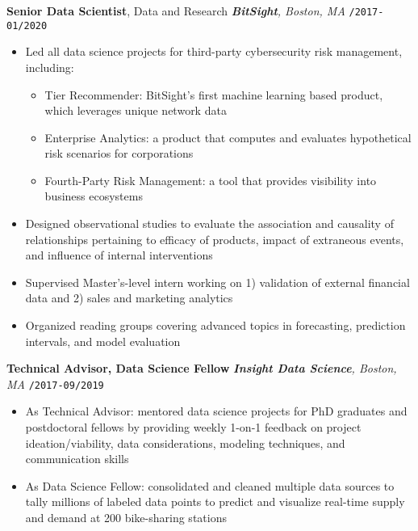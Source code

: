 \documentclass[10pt,english]{report}
\begin{document}
\vspace{1mm}

\textbf{Senior Data Scientist}, Data and Research \hfill \textit{\textbf{BitSight}, Boston, MA} \texttt{/2017-01/2020}
\begin{itemize}
		\item Led all data science projects for third-party cybersecurity risk management, including:
		\begin{itemize}
				\item Tier Recommender: BitSight's first machine learning based product, which leverages unique network data
				\item Enterprise Analytics: a product that computes and evaluates hypothetical risk scenarios for corporations
				\item Fourth-Party Risk Management: a tool that provides visibility into business ecosystems
		\end{itemize}
    \item Designed observational studies to evaluate the association and causality of relationships pertaining to efficacy of products, impact of extraneous events, and influence of internal interventions
		\item Supervised Master's-level intern working on 1) validation of external financial data and 2) sales and marketing analytics
		\item Organized reading groups covering advanced topics in forecasting, prediction intervals, and model evaluation
\end{itemize}

\vspace{1mm}

\textbf{Technical Advisor, Data Science Fellow} \hfill \textit{\textbf{Insight Data Science}, Boston, MA} \texttt{/2017-09/2019}
\begin{itemize}
    \item As Technical Advisor: mentored data science projects for PhD graduates and postdoctoral fellows by providing weekly 1-on-1 feedback on project ideation/viability, data considerations, modeling techniques, and communication skills
    \item As Data Science Fellow: consolidated and cleaned multiple data sources to tally millions of labeled data points to predict and visualize real-time supply and demand at 200 bike-sharing stations
\end{itemize}
\end{document}

